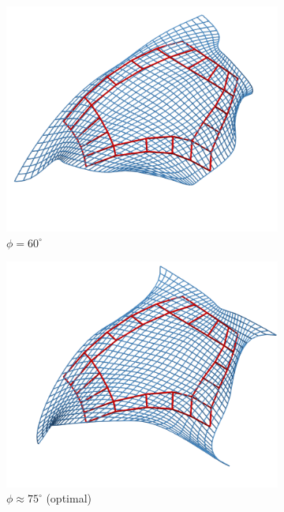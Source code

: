 \documentclass[9pt,academicons]{article}
\begin{document}
\begin{figure}[!ht]
  {
    \hfill
    \begin{subfigure}{.26\textwidth}
      \includegraphics[width=\textwidth]{images/rotations/60.png}
      \caption{$\phi=60^\circ$}
    \end{subfigure}
    \hfill
    \begin{subfigure}{.26\textwidth}
      \centering
      \includegraphics[width=\textwidth]{images/rotations/75-optimal.png}
      \caption{$\phi\approx 75^\circ$ (optimal)}
    \end{subfigure}
    \hfill
    \begin{subfigure}{.26\textwidth}

\end{subfigure}}
\end{figure}
\end{document}

